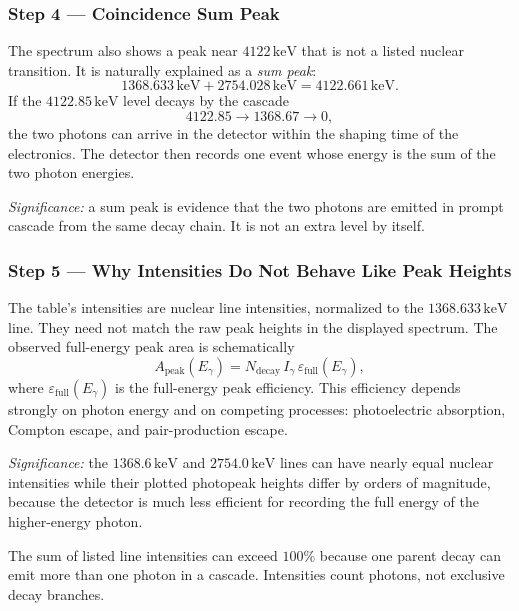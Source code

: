 \subsubsection*{Step 4 --- Coincidence Sum Peak}
The spectrum also shows a peak near $4122\,\text{keV}$ that is not a listed
nuclear transition. It is naturally explained as a \emph{sum peak}:
\begin{equation}
  \label{eq:lec10:sum_peak}
  \boxed{
  1368.633\,\text{keV}+2754.028\,\text{keV}
  = 4122.661\,\text{keV}.}
\end{equation}
If the $4122.85\,\text{keV}$ level decays by the cascade
\[
  4122.85 \to 1368.67 \to 0,
\]
the two photons can arrive in the detector within the shaping time of the
electronics. The detector then records one event whose energy is the sum of the
two photon energies.

\textit{Significance:} a sum peak is evidence that the two photons are emitted in
prompt cascade from the same decay chain. It is not an extra level by itself.

\subsubsection*{Step 5 --- Why Intensities Do Not Behave Like Peak Heights}
The table's intensities are nuclear line intensities, normalized to the
$1368.633\,\text{keV}$ line. They need not match the raw peak heights in the
displayed spectrum. The observed full-energy peak area is schematically
\begin{equation}
  \label{eq:lec10:observed_peak_area}
  A_\text{peak}(E_\gamma)
  =
  N_\text{decay}\,
  I_\gamma\,
  \varepsilon_\text{full}(E_\gamma),
\end{equation}
where $\varepsilon_\text{full}(E_\gamma)$ is the full-energy peak efficiency.
This efficiency depends strongly on photon energy and on competing processes:
photoelectric absorption, Compton escape, and pair-production escape.

\textit{Significance:} the $1368.6\,\text{keV}$ and $2754.0\,\text{keV}$ lines
can have nearly equal nuclear intensities while their plotted photopeak heights
differ by orders of magnitude, because the detector is much less efficient for
recording the full energy of the higher-energy photon.

The sum of listed line intensities can exceed $100\%$ because one parent decay
can emit more than one photon in a cascade. Intensities count photons, not
exclusive decay branches.

